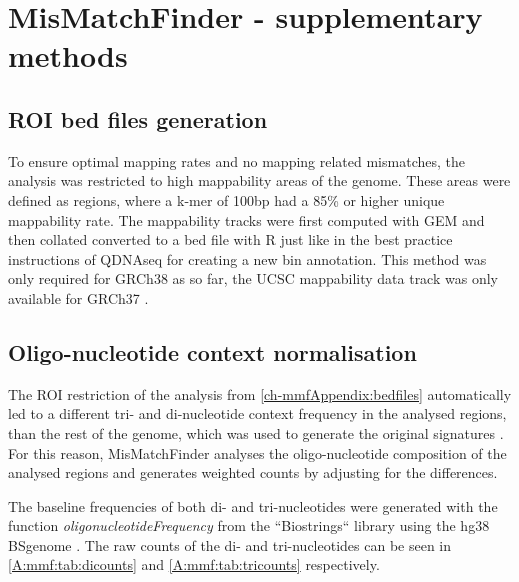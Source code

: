 \chapter{MisMatchFinder - supplementary methods}
\label{ch-mmfSuppMeth}

\section{ROI bed files generation}
\label{ch-mmfAppendix:bedfiles}

To ensure optimal mapping rates and no mapping related mismatches, the analysis was restricted to high mappability areas of the genome. These areas were defined as regions, where a k-mer of 100bp had a 85\% or higher unique mappability rate. The mappability tracks were first computed with GEM \cite{Derrien2012} and then collated converted to a bed file with R just like in the best practice instructions of QDNAseq \cite{Scheinin2014} for creating a new bin annotation. This method was only required for GRCh38 \cite{Schneider2017} as so far, the UCSC mappability data track was only available for GRCh37 \cite{Church2011}.

\section{Oligo-nucleotide context normalisation}
\label{ch-mmfAppendix:oligoNorm}
The ROI restriction of the analysis from \autoref{ch-mmfAppendix:bedfiles} automatically led to a different tri- and di-nucleotide context frequency in the analysed regions, than the rest of the genome, which was used to generate the original signatures \cite{Alexandrov2020}. For this reason, MisMatchFinder analyses the oligo-nu\-cle\-o\-tide composition of the analysed regions and generates weighted counts by adjusting for the differences. 

The baseline frequencies of both di- and tri-nucleotides were generated with the function \textit{oligonucleotideFrequency} from the ``Biostrings`` library \cite{Pages2020} using the hg38 BSgenome \cite{Pages2020a}. The raw counts of the di- and tri-nucleotides can be seen in \autoref{A:mmf:tab:dicounts} and \autoref{A:mmf:tab:tricounts} respectively.





